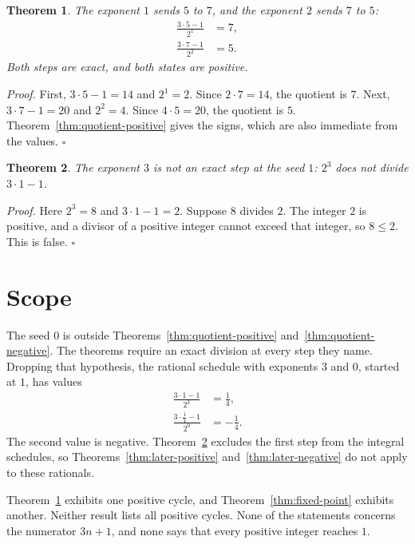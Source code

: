 \documentclass[11pt,letterpaper]{article}
\newtheorem{theorem}{Theorem}
\newenvironment{proof}{\noindent\textit{Proof.}}{\hfill\(\square\)}
\begin{document}
\begin{theorem}
\label{thm:cycle}
The exponent \(1\) sends \(5\) to \(7\), and the exponent \(2\) sends \(7\) to \(5\):
\begin{align*}
\frac{3\cdot 5-1}{2^{1}}&=7,\\
\frac{3\cdot 7-1}{2^{2}}&=5.
\end{align*}
Both steps are exact, and both states are positive.
\end{theorem}

\begin{proof}
First, \(3\cdot 5-1=14\) and \(2^{1}=2\). Since \(2\cdot 7=14\), the quotient is \(7\). Next, \(3\cdot 7-1=20\) and \(2^{2}=4\). Since \(4\cdot 5=20\), the quotient is \(5\). Theorem~\ref{thm:quotient-positive} gives the signs, which are also immediate from the values.
\end{proof}

\begin{theorem}
\label{thm:not-eight}
The exponent \(3\) is not an exact step at the seed \(1\): \(2^{3}\) does not divide \(3\cdot 1-1\).
\end{theorem}

\begin{proof}
Here \(2^{3}=8\) and \(3\cdot 1-1=2\). Suppose \(8\) divides \(2\). The integer \(2\) is positive, and a divisor of a positive integer cannot exceed that integer, so \(8\le 2\). This is false.
\end{proof}

\section{Scope}

The seed \(0\) is outside Theorems~\ref{thm:quotient-positive} and~\ref{thm:quotient-negative}. The theorems require an exact division at every step they name. Dropping that hypothesis, the rational schedule with exponents \(3\) and \(0\), started at \(1\), has values
\begin{align*}
\frac{3\cdot 1-1}{2^{3}}&=\frac{1}{4},\\
\frac{3\cdot\frac{1}{4}-1}{2^{0}}&=-\frac{1}{4}.
\end{align*}
The second value is negative. Theorem~\ref{thm:not-eight} excludes the first step from the integral schedules, so Theorems~\ref{thm:later-positive} and~\ref{thm:later-negative} do not apply to these rationals.

Theorem~\ref{thm:cycle} exhibits one positive cycle, and Theorem~\ref{thm:fixed-point} exhibits another. Neither result lists all positive cycles. None of the statements concerns the numerator \(3n+1\), and none says that every positive integer reaches \(1\).
\end{document}
